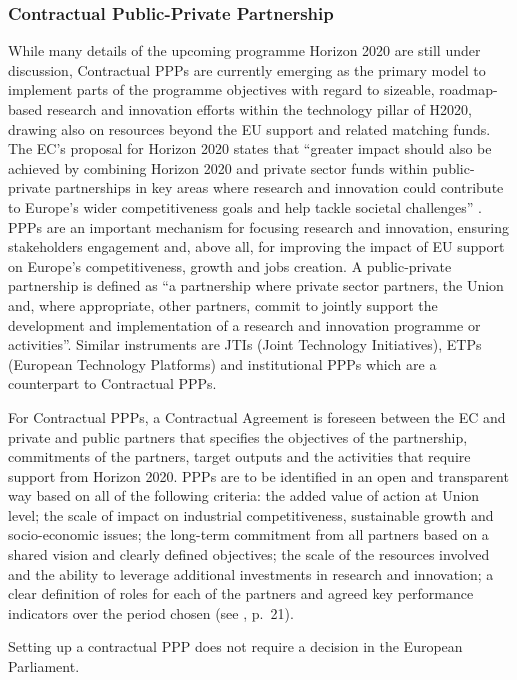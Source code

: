 \documentclass[10pt, plain]{../../metanetpaper}
\begin{document}
\begin{multicols}{2}
\subsubsection{Contractual Public-Private Partnership}
\label{sec:contr-ppp}

While many details of the upcoming programme Horizon 2020 are still under discussion, Contractual PPPs are currently emerging as the primary model to implement parts of the programme objectives with regard to sizeable, roadmap-based research and innovation efforts within the technology pillar of H2020, drawing also on resources beyond the EU support and related matching funds. The EC's proposal for Horizon 2020 states that ``greater impact should also be achieved by combining Horizon 2020 and private sector funds within public-private partnerships in key areas where research and innovation could contribute to Europe's wider competitiveness goals and help tackle societal challenges'' \cite{H2020prop}.  PPPs are an important mechanism for focusing research and innovation, ensuring stakeholders engagement and, above all, for improving the impact of EU support on Europe's competitiveness, growth and jobs creation. A public-private partnership is defined as ``a partnership where private sector partners, the Union and, where appropriate, other partners, commit to jointly support the development and implementation of a research and innovation programme or activities''. Similar instruments are JTIs (Joint Technology Initiatives), ETPs (European Technology Platforms) and institutional PPPs which are a counterpart to Contractual PPPs.

For Contractual PPPs, a Contractual Agreement is foreseen between the EC and private and public partners that specifies the objectives of the partnership, commitments of the partners, target outputs and the activities that require support from Horizon 2020. PPPs are to be identified in an open and transparent way based on all of the following criteria: the added value of action at Union level; the scale of impact on industrial competitiveness, sustainable growth and socio-economic issues; the long-term commitment from all partners based on a shared vision and clearly defined objectives; the scale of the resources involved and the ability to leverage additional investments in research and innovation; a clear definition of roles for each of the partners and agreed key performance indicators over the period chosen (see \cite{H2020prop}, p.~21). 

Setting up a contractual PPP does not require a decision in the European Parliament.  


\end{multicols}
\end{document}
